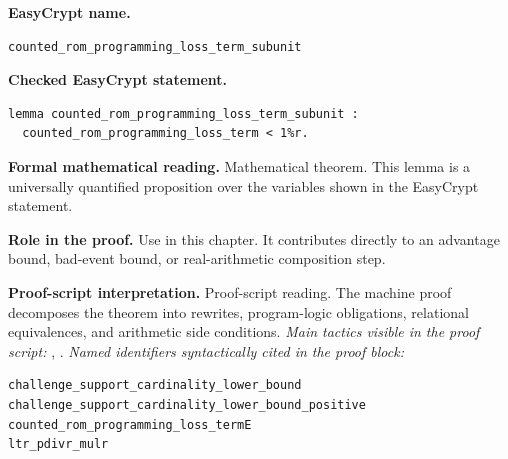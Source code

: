 \begin{formaltheorem}
\noindent\textbf{EasyCrypt name.}
\begin{lstlisting}[language=EasyCrypt,basicstyle=\ttfamily\scriptsize]
counted_rom_programming_loss_term_subunit
\end{lstlisting}
\noindent\textbf{Checked EasyCrypt statement.}
\begin{lstlisting}[language=EasyCrypt,basicstyle=\ttfamily\scriptsize]
lemma counted_rom_programming_loss_term_subunit :
  counted_rom_programming_loss_term < 1%r.
\end{lstlisting}
\noindent\textbf{Formal mathematical reading.}
Mathematical theorem. This lemma is a universally quantified proposition over the variables shown in the EasyCrypt statement.

\noindent\textbf{Role in the proof.}
Use in this chapter. It contributes directly to an advantage bound, bad-event bound, or real-arithmetic composition step.

\noindent\textbf{Proof-script interpretation.}
Proof-script reading. The machine proof decomposes the theorem into rewrites, program-logic obligations, relational equivalences, and arithmetic side conditions.
\emph{Main tactics visible in the proof script:} , .
\emph{Named identifiers syntactically cited in the proof block:}
\begin{lstlisting}[language=EasyCrypt,basicstyle=\ttfamily\scriptsize]
challenge_support_cardinality_lower_bound
challenge_support_cardinality_lower_bound_positive
counted_rom_programming_loss_termE
ltr_pdivr_mulr
\end{lstlisting}

\end{formaltheorem}

